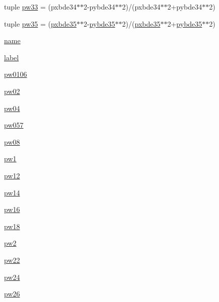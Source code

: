 \begin{DoxyCompactItemize}
tuple \mbox{\hyperlink{namespacewBDE_a1c44a143c96f2bf9ec07050d9b49a747}{pw33}} = (pxbde34$\ast$$\ast$2-\/pybde34$\ast$$\ast$2)/(pxbde34$\ast$$\ast$2+pybde34$\ast$$\ast$2)
\item 
tuple \mbox{\hyperlink{namespacewBDE_a3d2638469853dcc57314cb3c96c37c44}{pw35}} = (\mbox{\hyperlink{namespacewBDE_a191d448c5a5e490e61328d7f371c7f33}{pxbde35}}$\ast$$\ast$2-\/\mbox{\hyperlink{namespacewBDE_a37997e956a6d587ae1d2400ce7873da8}{pybde35}}$\ast$$\ast$2)/(\mbox{\hyperlink{namespacewBDE_a191d448c5a5e490e61328d7f371c7f33}{pxbde35}}$\ast$$\ast$2+\mbox{\hyperlink{namespacewBDE_a37997e956a6d587ae1d2400ce7873da8}{pybde35}}$\ast$$\ast$2)
\item 
\mbox{\hyperlink{namespacewBDE_adde0099470d16aea351f0567c152ca76}{name}}
\item 
\mbox{\hyperlink{namespacewBDE_a94070e614d5d42c63b74274eb89af0c8}{label}}
\item 
\mbox{\hyperlink{namespacewBDE_ace83e7c6ea645975f4ab4d40f9f8d609}{pw0106}}
\item 
\mbox{\hyperlink{namespacewBDE_a349ea9d0091a1e0e0c1a32eead43ee85}{pw02}}
\item 
\mbox{\hyperlink{namespacewBDE_a68e42f8ad69614fbe52fe8e56130a334}{pw04}}
\item 
\mbox{\hyperlink{namespacewBDE_a50eb888b1c78670796840f459e078b31}{pw057}}
\item 
\mbox{\hyperlink{namespacewBDE_a8ba6a5b1ce1343a18a5fc9211142f3c8}{pw08}}
\item 
\mbox{\hyperlink{namespacewBDE_a21dc58702dd015dbfeec0a35b9cf3914}{pw1}}
\item 
\mbox{\hyperlink{namespacewBDE_a2dbdaa5ff26b921e6acf4619af84aaa1}{pw12}}
\item 
\mbox{\hyperlink{namespacewBDE_a56c818d9fb4079d9c931d86f1e5cca26}{pw14}}
\item 
\mbox{\hyperlink{namespacewBDE_a7ea4042a7bd7c90d85664d7dfeac15fb}{pw16}}
\item 
\mbox{\hyperlink{namespacewBDE_aabaaff0e081a866df6f651fb368048ab}{pw18}}
\item 
\mbox{\hyperlink{namespacewBDE_a789b443e0c9b73c4124fc4b3259bf9ab}{pw2}}
\item 
\mbox{\hyperlink{namespacewBDE_ad70ef12d694c750320dec036fc7899f1}{pw22}}
\item 
\mbox{\hyperlink{namespacewBDE_a73cd5989b2e07df6745ce55b999b79c1}{pw24}}
\item 
\mbox{\hyperlink{namespacewBDE_a9f31f7933adc96f4997375e32b7fd3fb}{pw26}}
\item 

\end{DoxyCompactItemize}
